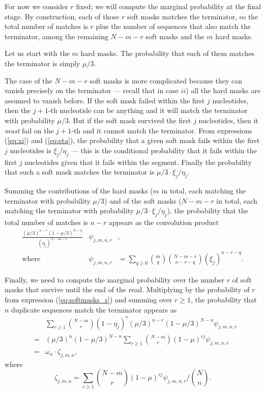 \documentclass{article}
\begin{document}
For now we consider $r$ fixed; we will compute the marginal probability at
the final stage. By construction, each of those $r$ soft masks matches the
terminator, so the total number of matches is $r$ plus the number of
sequences that also match the terminator, among the remaining $N-m-r$ soft
masks and the $m$ hard masks.

Let us start with the $m$ hard masks. The probability that each of them
matches the terminator is simply $\mu/3$.

The case of the $N-m-r$ soft masks is more complicated because they can
vanish precisely on the terminator --- recall that in case $ii$) all the
hard masks are assumed to vanish before. If the soft mask failed within
the first $j$ nucleotides, then the $j+1$-th nucleotide can be anything
and it will match the terminator with probability $\mu/3$. But if the soft
mask survived the first $j$ nucleotides, then it \emph{must} fail on the
$j+1$-th and it cannot match the terminator. From expressions
(\ref{eq:xi}) and (\ref{eq:eta}), the probability that a given soft mask
fails within the first $j$ nucleotides is $\xi_j/\eta_j$ --- this is the
conditional probability that it fails within the first $j$ nucleotides
given that it fails within the segment. Finally the probability that such
a soft mask matches the terminator is $\mu/3 \cdot \xi_j / \eta_j$.

Summing the contributions of the hard masks ($m$ in total, each matching
the terminator with probability $\mu/3$) and of the soft masks ($N-m-r$ in
total, each matching the terminator with probability
$\mu/3\cdot\xi_j/\eta_j$), the probability that the total number of
matches is $n-r$ appears as the convolution product
\begin{eqnarray*}
\frac{(\mu/3)^{n-r}(1-\mu/3)^{N-n}}{(\eta_j)^{N-m-r}}
&\psi_{j,m,n,r}&, \\
\text{where }
&\psi_{j,m,n,r}& = \sum_{q \geq 0}{m \choose q}{N-m-r \choose n-r-q}
(\xi_j)^{n-r-q}.
\end{eqnarray*}

Finally, we need to compute the marginal probability over the number $r$
of soft masks that survive until the end of the read. Multiplying by the
probability of $r$ from expression (\ref{eq:softmasks_r}) and summing over
$r \geq 1$, the probability that $n$ duplicate sequences match the
terminator appears as
\begin{eqnarray*}
&\;& \sum_{r\geq1} {N-m \choose r}
(1 - \eta_j)^r (\mu/3)^{n-r} (1-\mu/3)^{N-n} \psi_{j,m,n,r} \\
&=& (\mu/3)^n(1-\mu/3)^{N-n} \sum_{r\geq1} {N-m \choose r}
  (1 - \mu)^{rj} \psi_{j,m,n,r} \\
&=& \omega_n \cdot \zeta_{j,m,n},
\end{eqnarray*}
where
\begin{equation}
\label{eq:zeta}
\zeta_{j,m,n} = \sum_{r\geq1} {N-m \choose r}
(1-\mu)^{rj} \psi_{j,m,n,r} \bigg/ {N \choose n}.
\end{equation}
\end{document}
